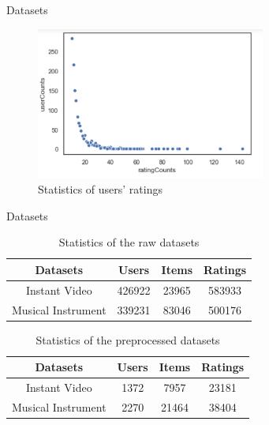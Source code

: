 \documentclass{beamer}
\begin{document}
\begin{frame}{Datasets}


\begin{figure}
\includegraphics[height=5cm]{figure3.png}
\caption{Statistics of users' ratings}
\end{figure}




\end{frame}









\begin{frame}{Datasets}

\begin{table}[]
    \centering
    \begin{tabular}{cccc}
    \toprule  
    Datasets & Users & Items & Ratings\\
    \midrule  
    Instant Video & 426922 & 23965 & 583933  \\
    Musical Instrument & 339231 & 83046 & 500176  \\
    \bottomrule
    \end{tabular}
    \caption{Statistics of the raw datasets}
\end{table}


\begin{table}[]
    \centering
    \begin{tabular}{cccc}
    \toprule  
    Datasets & Users & Items & Ratings\\
    \midrule  
    Instant Video & 1372 & 7957 & 23181 \\
    Musical Instrument & 2270 & 21464 & 38404 \\
    \bottomrule
    \end{tabular}
    \caption{Statistics of the preprocessed datasets}
\end{table}
    
    
\end{frame}
\end{document}
